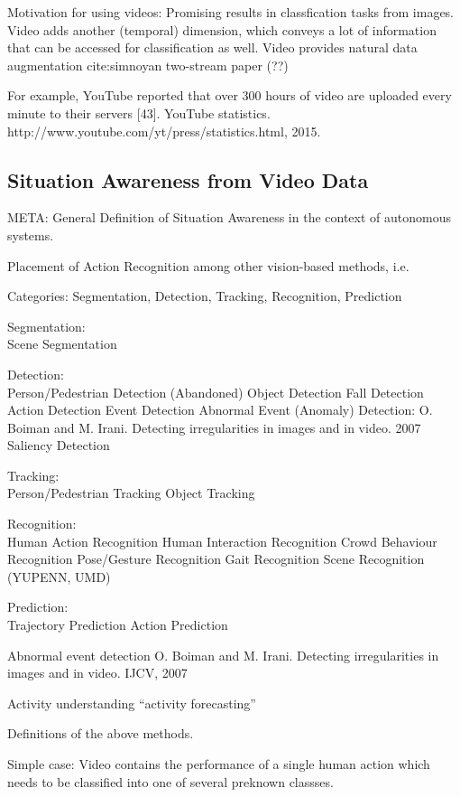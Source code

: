Motivation for using videos: Promising results in classfication tasks from images.
Video adds another (temporal) dimension, which conveys a lot of information that can be accessed for classification as well.
Video provides natural data augmentation cite:simnoyan two-stream paper (??)

For example, YouTube reported that over 300 hours of video are uploaded every minute to their servers [43]. YouTube statistics. http://www.youtube.com/yt/press/statistics.html, 2015.

\subsection{Situation Awareness from Video Data}

META: General Definition of Situation Awareness in the context of autonomous systems.

Placement of Action Recognition among other vision-based methods, i.e.

Categories: Segmentation, Detection, Tracking, Recognition, Prediction

Segmentation:\\
Scene Segmentation

Detection:\\
Person/Pedestrian Detection
(Abandoned) Object Detection
Fall Detection
Action Detection
Event Detection
Abnormal Event (Anomaly) Detection: O. Boiman and M. Irani. Detecting irregularities in images and in video. 2007
Saliency Detection

Tracking:\\
Person/Pedestrian Tracking
Object Tracking

Recognition:\\
Human Action Recognition
Human Interaction Recognition
Crowd Behaviour Recognition
Pose/Gesture Recognition
Gait Recognition
Scene Recognition (YUPENN, UMD)

Prediction:\\
Trajectory Prediction
Action Prediction

Abnormal event detection O. Boiman and M. Irani. Detecting irregularities in images and in video. IJCV, 2007

Activity understanding ``activity forecasting''

Definitions of the above methods.

Simple case: Video contains the performance of a single human action which needs to be classified into one of several preknown classses.

